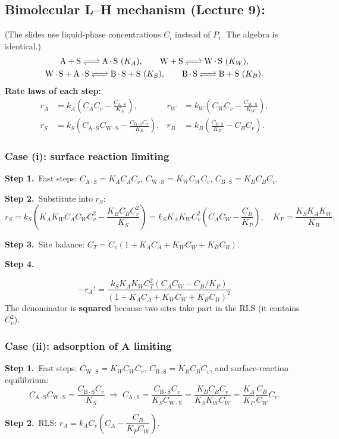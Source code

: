 \documentclass[11pt]{article}
\newcommand{\step}[1]{\par\smallskip\textcolor{stepgray}{\textbf{Step #1.}}\ }
\newcommand{\AS}[1]{\mathrm{#1\!\cdot\!S}}
\begin{document}
\subsection{Bimolecular L--H mechanism (Lecture 9): }
(The slides use liquid-phase concentrations $C_i$ instead of $P_i$. The algebra is identical.)
\begin{gather*}
\ce{A + S <=> A.S}\ (K_A),\qquad \ce{W + S <=> W.S}\ (K_W),\\
\ce{W.S + A.S <=> B.S + S}\ (K_S),\qquad \ce{B.S <=> B + S}\ (K_B).
\end{gather*}
\textbf{Rate laws of each step:}
\begin{align*}
r_A&=k_A\!\left(C_AC_v-\frac{C_{\AS{A}}}{K_A}\right), &
r_W&=k_W\!\left(C_WC_v-\frac{C_{\AS{W}}}{K_W}\right),\\
r_S&=k_S\!\left(C_{\AS{A}}C_{\AS{W}}-\frac{C_{\AS{B}}C_v}{K_S}\right), &
r_B&=k_B\!\left(\frac{C_{\AS{B}}}{K_B}-C_BC_v\right).
\end{align*}

\subsubsection*{Case (i): surface reaction limiting}
\step{1}Fast steps: $C_{\AS{A}}=K_AC_AC_v$, $C_{\AS{W}}=K_WC_WC_v$, $C_{\AS{B}}=K_BC_BC_v$.

\step{2}Substitute into $r_S$:
\[
r_S=k_S\left(K_AK_WC_AC_WC_v^2-\frac{K_BC_BC_v^2}{K_S}\right)=k_SK_AK_WC_v^2\left(C_AC_W-\frac{C_B}{K_P}\right),\quad K_P=\frac{K_SK_AK_W}{K_B}.
\]
\step{3}Site balance: $C_T=C_v(1+K_AC_A+K_WC_W+K_BC_B)$.

\step{4}
\begin{keyresult}
\[
-r_A'=\frac{k_SK_AK_WC_T^2\left(C_AC_W-C_B/K_P\right)}{\left(1+K_AC_A+K_WC_W+K_BC_B\right)^2}
\]
The denominator is \textbf{squared} because two sites take part in the RLS (it contains $C_v^2$).
\end{keyresult}

\subsubsection*{Case (ii): adsorption of A limiting}
\step{1}Fast steps: $C_{\AS{W}}=K_WC_WC_v$, $C_{\AS{B}}=K_BC_BC_v$, and surface-reaction equilibrium:
\[
C_{\AS{A}}C_{\AS{W}}=\frac{C_{\AS{B}}C_v}{K_S}\;\Rightarrow\;
C_{\AS{A}}=\frac{C_{\AS{B}}C_v}{K_SC_{\AS{W}}}=\frac{K_BC_BC_v}{K_SK_WC_W}=\frac{K_A}{K_P}\frac{C_B}{C_W}C_v .
\]
\step{2}RLS: $r_A=k_AC_v\left(C_A-\dfrac{C_B}{K_PC_W}\right)$.
\end{document}
